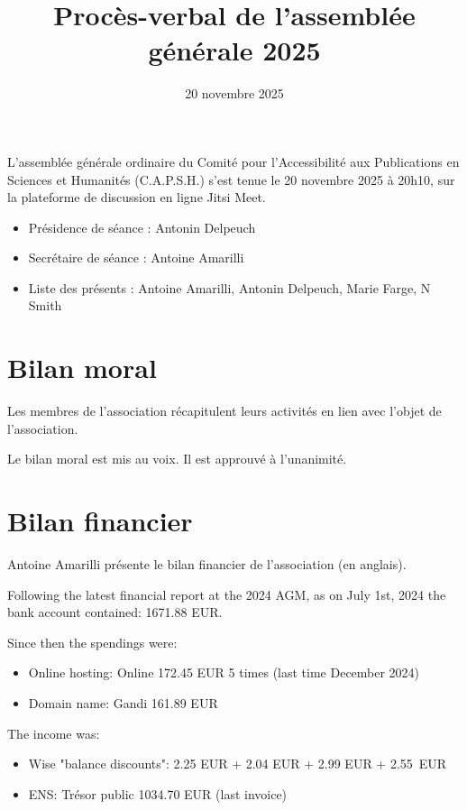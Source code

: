 \documentclass[a4paper]{article}
\title{Procès-verbal de l'assemblée générale 2025}
\date{20 novembre 2025}
\begin{document}
\maketitle

L'assemblée générale ordinaire du Comité pour l'Accessibilité aux Publications
en Sciences et Humanités (C.A.P.S.H.) s'est tenue le 20 novembre 2025 à 20h10,
sur la plateforme de discussion en ligne Jitsi Meet.

\begin{itemize}
  \item Présidence de séance : Antonin Delpeuch
  \item Secrétaire de séance : Antoine Amarilli
  \item Liste des présents : Antoine Amarilli, Antonin Delpeuch, Marie Farge,
    N Smith
\end{itemize}

\section{Bilan moral}

Les membres de l'association récapitulent leurs activités en lien avec l'objet
de l'association.

Le bilan moral est mis au voix. Il est approuvé à l'unanimité.

\section{Bilan financier}

Antoine Amarilli présente le bilan financier de l'association (en anglais).

Following the latest financial report at the 2024 AGM, as on July 1st, 2024 the
bank account contained: 1671.88 EUR.

Since then the spendings were:

\begin{itemize}
  \item Online hosting: Online 172.45 EUR 5 times (last time December 2024)
  \item Domain name: Gandi 161.89 EUR
\end{itemize}

The income was:

\begin{itemize}
  \item Wise "balance discounts": 2.25 EUR + 2.04 EUR + 2.99 EUR + 2.55~EUR
  \item ENS: Trésor public 1034.70 EUR (last invoice)
\end{itemize}
\end{document}
